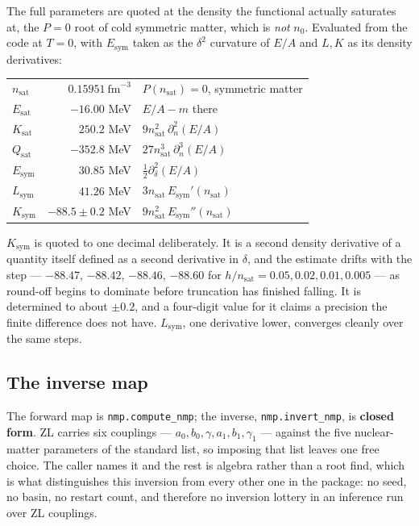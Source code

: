 \documentclass[aps,prc,onecolumn,superscriptaddress,nofootinbib,10pt]{revtex4-2}
\newcommand{\nsat}{n_{\mathrm{sat}}}
\begin{document}
The full parameters are quoted at the density the functional actually
saturates at, the $P = 0$ root of cold symmetric matter, which is
\emph{not} $n_0$. Evaluated from the code at $T = 0$, with $E_{\mathrm{sym}}$
taken as the $\delta^2$ curvature of $E/A$ and $L, K$ as its density
derivatives:
%
\begin{center}
\begin{tabular}{lrl}
\toprule
$\nsat$              & $0.15951\ \mathrm{fm}^{-3}$ & $P(\nsat) = 0$, symmetric matter \\
$E_{\mathrm{sat}}$   & $-16.00$ MeV & $E/A - m$ there \\
$K_{\mathrm{sat}}$   & $250.2$ MeV  & $9 \nsat^2\, \partial_n^2 (E/A)$ \\
$Q_{\mathrm{sat}}$   & $-352.8$ MeV & $27 \nsat^3\, \partial_n^3 (E/A)$ \\
$E_{\mathrm{sym}}$   & $30.85$ MeV  & $\tfrac12 \partial_\delta^2 (E/A)$ \\
$L_{\mathrm{sym}}$   & $41.26$ MeV  & $3 \nsat\, E_{\mathrm{sym}}'(\nsat)$ \\
$K_{\mathrm{sym}}$   & $-88.5 \pm 0.2$ MeV & $9 \nsat^2\, E_{\mathrm{sym}}''(\nsat)$ \\
\bottomrule
\end{tabular}
\end{center}
%
$K_{\mathrm{sym}}$ is quoted to one decimal deliberately. It is a second
density derivative of a quantity itself defined as a second derivative in
$\delta$, and the estimate drifts with the step --- $-88.47$, $-88.42$,
$-88.46$, $-88.60$ for $h/\nsat = 0.05, 0.02, 0.01, 0.005$ --- as round-off
begins to dominate before truncation has finished falling. It is determined to
about $\pm 0.2$, and a four-digit value for it claims a precision the finite
difference does not have. $L_{\mathrm{sym}}$, one derivative lower, converges
cleanly over the same steps.

\subsection{The inverse map}
\label{sec:invert}

The forward map is \texttt{nmp.compute\_nmp}; the inverse,
\texttt{nmp.invert\_nmp}, is \textbf{closed form}. ZL carries six couplings
--- $a_0, b_0, \gamma, a_1, b_1, \gamma_1$ --- against the five nuclear-matter
parameters of the standard list, so imposing that list leaves one free choice.
The caller names it and the rest is algebra rather than a root find, which is
what distinguishes this inversion from every other one in the package: no seed,
no basin, no restart count, and therefore no inversion lottery in an inference
run over ZL couplings.
\end{document}
